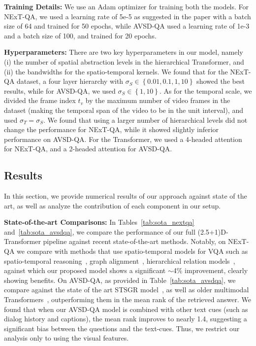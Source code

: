 \documentclass[letterpaper]{article} \usepackage{aaai22}  \usepackage{times}  \usepackage{helvet}  \usepackage{courier}  \usepackage[hyphens]{url}  \usepackage{graphicx} \urlstyle{rm} \def\UrlFont{\rm}  \usepackage{natbib}  \usepackage{caption} \DeclareCaptionStyle{ruled}{labelfont=normalfont,labelsep=colon,strut=off} \frenchspacing  \setlength{\pdfpagewidth}{8.5in}  \setlength{\pdfpageheight}{11in}  \usepackage{algorithm}
\newcommand{\nameTxr}{(2.5+1)D-Transformer\xspace}
\newcommand{\node}{v}
\newcommand{\set}[1]{\left\{#1\right\}}
\begin{document}
\noindent\textbf{Training Details:} We use an Adam optimizer for training both the models. For NExT-QA, we used a learning rate of 5e-5 as suggested in the paper with a batch size of 64 and trained for 50 epochs, while AVSD-QA used a learning rate of 1e-3 and a batch size of 100, and trained for 20 epochs.

\noindent\textbf{Hyperparameters:} There are two key hyperparameters in our model, namely (i) the number of spatial abstraction levels in the hierarchical Transformer, and (ii) the bandwidths for the spatio-temporal kernels. We found that for the NExT-QA dataset, a four layer hierarchy with $\sigma_S\in\set{0.01, 0.1, 1, 10}$ showed the best results, while for
AVSD-QA, we used $\sigma_S\in\set{1,10}$. As for the temporal scale, we divided the frame index $t_\node$ by the maximum number of video frames in the dataset (making the temporal span of the video to be in the unit interval), and used $\sigma_T=\sigma_S$. We found that using a larger number of hierarchical levels did not change the performance for NExT-QA, while it showed slightly inferior performance on AVSD-QA. For the Transformer, we used a 4-headed attention for NExT-QA, and a 2-headed attention for AVSD-QA. 

\subsection{Results}
In this section, we provide numerical results of our approach against state of the art, as well as analyze the contribution of each component in our setup. 

\noindent\textbf{State-of-the-art Comparisons:} In Tables~\ref{tab:sota_nextqa} and~\ref{tab:sota_avsdqa}, we compare the performance of our full \nameTxr pipeline against recent state-of-the-art methods. Notably, on NExT-QA we compare with methods that use spatio-temporal models for VQA such as spatio-temporal reasoning~\cite{jang2019video}, graph alignment~\cite{jiang2020reasoning}, hierarchical relation models~\cite{le2020hierarchical}, against which our proposed model shows a significant $\sim$4\% improvement, clearly showing benefits. On AVSD-QA, as provided in Table~\ref{tab:sota_avsdqa}, we compare against the state of the art STSGR model~\cite{geng2021dynamic}, as well as older multimodal Transformers~\cite{le2019multimodal}, outperforming them in the mean rank of the retrieved answer. We found that when our AVSD-QA model is combined with other text cues (such as dialog history and captions), the mean rank improves to nearly 1.4, suggesting a significant bias between the questions and the text-cues. Thus, we restrict our analysis only to using the visual features.
\end{document}
